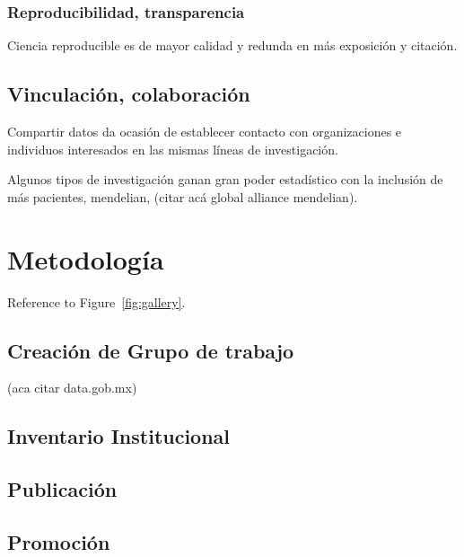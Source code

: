 \documentclass[
10pt, %
letterpaper, %
oneside, %
headinclude,footinclude, %
BCOR5mm, %
]{scrartcl}
\begin{document}
\subsubsection{Reproducibilidad, transparencia}
Ciencia reproducible es de mayor calidad y redunda en más exposición y
citación. \cite{piwowar_sharing_2007} \cite{ioannidis}

\subsection{Vinculación, colaboración}
Compartir datos da ocasión de establecer contacto con organizaciones e
individuos interesados en las mismas líneas de investigación.

Algunos tipos de investigación ganan gran poder estadístico con la
inclusión de más pacientes, mendelian, (citar acá global alliance
mendelian). 


\section{Metodología}
Reference to Figure~\vref{fig:gallery}. %



\subsection{Creación de Grupo de trabajo}
(aca citar data.gob.mx)

\subsection{Inventario Institucional}
\cite{_nih_????}

\subsection{Publicación}


\subsection{Promoción}
\cite{schofield_post-publication_2009}
\end{document}
